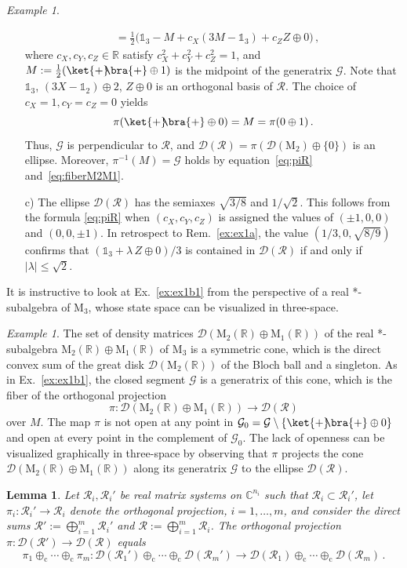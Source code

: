 \documentclass[a4paper,11pt,reqno]{amsart}
\newcommand{\C}{\mathbb{C}}
\newcommand{\R}{\mathbb{R}}
\newcommand{\M}{\mathrm{M}}
\newcommand{\cD}{\mathcal{D}}
\newcommand{\cG}{\mathcal{G}}
\newcommand{\cR}{\mathcal{R}}
\newcommand{\id}{\mathds{1}}
\newcommand{\dcs}{\oplus_\mathrm{c}}
\newtheorem{lem}[thm]{Lemma}
\theoremstyle{definition}
\theoremstyle{remark}
\newtheorem{exa}[thm]{Example}
\numberwithin{equation}{section}
\begin{document}
\begin{exa}
\begin{enumerate}
\begin{align}
\nonumber
&\textstyle 
=\frac{1}{2}\big(%
\id_3-M
+c_X(3M-\id_3)
+c_ZZ\oplus0\big)\,,
\end{align}
where $c_X,c_Y,c_Z\in\R$ satisfy $c_X^2+c_Y^2+c_Z^2=1$, and 
$M:=\frac{1}{2}(\ket{+}\!\!\bra{+}\oplus 1)$ is the midpoint of the generatrix 
$\cG$. Note that $\id_3$, $(3X-\id_2)\oplus2$, $Z\oplus 0$ is an orthogonal 
basis of $\cR$. The choice of $c_X=1,c_Y=c_Z=0$ yields
\begin{equation}\label{eq:fiberM2M1}\textstyle
\pi(\ket{+}\!\!\bra{+}\oplus0)=M=\pi(0\oplus 1)\,.
\end{equation}
Thus, $\cG$ is perpendicular to $\cR$, and  $\cD(\cR)=\pi(\cD(\M_2)\oplus\{0\})$ 
is an ellipse. Moreover, $\pi^{-1}(M)=\cG$ holds by equation~\eqref{eq:piR} 
and~\eqref{eq:fiberM2M1}. 
%
\item[c)]
The ellipse $\cD(\cR)$ has the semiaxes $\sqrt{3/8}$ and $1/\sqrt{2}$. This
follows from the formula \eqref{eq:piR} when $(c_X,c_Y,c_Z)$ is assigned the
values of $(\pm1,0,0)$ and $(0,0,\pm1)$. In retrospect to Rem.~\ref{ex:ex1a}, 
the value $(1/3,0,\sqrt{8/9})$ confirms that $(\id_3+\lambda\,Z\oplus 0)/3$ 
is contained in $\cD(\cR)$ if and only if $|\lambda|\leq\sqrt{2}$. 
\end{enumerate}
\end{exa}
%
It is instructive to look at Ex.~\ref{ex:ex1b1} from the perspective of a
real *-subalgebra of $\M_3$, whose state space can be visualized in 
three-space.
\par
%
\begin{exa}\label{ex:ex1b2}
The set of density matrices $\cD(\M_2(\R)\oplus\M_1(\R))$ of the real 
*-subalgebra $\M_2(\R)\oplus\M_1(\R)$ of $\M_3$ is a symmetric cone, which 
is the direct convex sum of the great disk $\cD(\M_2(\R))$ of the Bloch ball 
and a singleton. As in Ex.~\ref{ex:ex1b1}, the closed segment $\cG$ is a 
generatrix of this cone, which is the fiber of the orthogonal 
projection 
\[\textstyle
\pi:\cD(\M_2(\R)\oplus\M_1(\R))\to\cD(\cR)
\]
over $M$. The map $\pi$ is not open at any point in 
$\cG_0=\cG\setminus\{\ket{+}\!\!\bra{+}\oplus 0\}$ and open at every point 
in the complement of $\cG_0$. The lack of openness can be visualized 
graphically in three-space by observing that $\pi$ projects the cone 
$\cD(\M_2(\R)\oplus\M_1(\R))$ along its generatrix $\cG$ to the ellipse 
$\cD(\cR)$. 
\end{exa}
%
\begin{lem}\label{lem:dir-sum-proj}
Let $\cR_i,\cR_i'$ be real matrix systems on $\C^{n_i}$ such that
$\cR_i\subset\cR_i'$, let $\pi_i:\cR_i'\to\cR_i$ denote the orthogonal 
projection, $i=1,\ldots,m$, and consider the direct sums 
$\cR':=\bigoplus_{i=1}^m\cR_i'$ and $\cR:=\bigoplus_{i=1}^m\cR_i$. The 
orthogonal projection $\pi:\cD(\cR')\to\cD(\cR)$ equals
\[
\pi_1\dcs\cdots\dcs\pi_m:
\cD(\cR_1')\dcs\cdots\dcs\cD(\cR_m')
\to\cD(\cR_1)\dcs\cdots\dcs\cD(\cR_m)\,.
\]
\end{lem}
\end{document}
